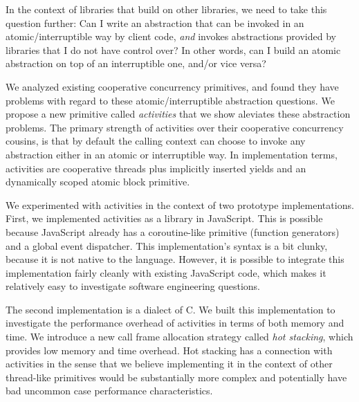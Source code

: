 \documentclass[9pt,preprint]{sigplanconf}
\begin{document}
In the context of libraries that build on other libraries, we need to take this question further:
Can I write an abstraction that can be invoked in an atomic/interruptible way by client code, \emph{and} invokes abstractions provided by libraries that I do not have control over?
In other words, can I build an atomic abstraction on top of an interruptible one, and/or vice versa?

We analyzed existing cooperative concurrency primitives, and found they have problems with regard to these atomic/interruptible abstraction questions.
We propose a new primitive called \emph{activities} that we show aleviates these abstraction problems.
The primary strength of activities over their cooperative concurrency cousins, is that by default the calling context can choose to invoke any abstraction either in an atomic or interruptible way.
In implementation terms, activities are cooperative threads plus implicitly inserted yields and an dynamically scoped atomic block primitive.

We experimented with activities in the context of two prototype implementations.
First, we implemented activities as a library in JavaScript.
This is possible because JavaScript already has a coroutine-like primitive (function generators) and a global event dispatcher.
This implementation's syntax is a bit clunky, because it is not native to the language.
However, it is possible to integrate this implementation fairly cleanly with existing JavaScript code, which makes it relatively easy to investigate software engineering questions.

The second implementation is a dialect of C.
We built this implementation to investigate the performance overhead of activities in terms of both memory and time.
We introduce a new call frame allocation strategy called \emph{hot stacking}, which provides low memory and time overhead.
Hot stacking has a connection with activities in the sense that we believe implementing it in the context of other thread-like primitives would be substantially more complex and potentially have bad uncommon case performance characteristics.


\end{document}
